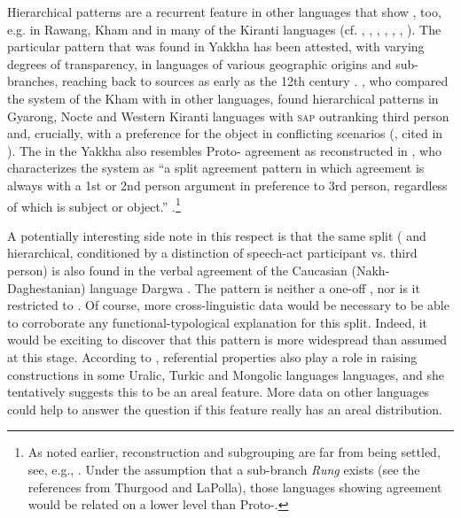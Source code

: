 Hierarchical patterns are a recurrent feature  in other  languages that show , too, e.g. in Rawang, Kham and in many of the Kiranti languages (cf. \citealt[317]{DeLancey1989Verb}, \citealt[311]{LaPolla1992Dating}, \citealt[30]{LaPolla2003_Overview}, \citealt{LaPolla2007Hierarchical}, \citealt[473]{Ebert1987Grammatical}, \citealt[1]{DeLancey2011_Notes}, \citealt[398]{Watters2002A-grammar}). The particular pattern that was found in Yakkha has been attested, with varying degrees of transparency, in  languages of various geographic origins and sub-branches, reaching back to  sources as early as the 12th century \citep{Kepping1975_Subject, Kepping1994The-conjugation}. \citet{Watters2002A-grammar}, who compared the  system of the Kham  with  in other  languages, found hierarchical patterns in Gyarong, Nocte and Western Kiranti languages with \textsc{sap} outranking third person and, crucially, with a preference for the object in conflicting scenarios (\citet{Nagano1984A-historical}, cited in \citealt[388]{Watters2002A-grammar}). The  in the Yakkha  also resembles Proto- agreement as reconstructed in \citet{DeLancey1989Verb}, who characterizes the system as  “a split  agreement pattern in which agreement is always with a 1st or 2nd person argument in preference to 3rd person, regardless of which is subject or object.” \citep[317]{DeLancey1989Verb}.\footnote{As noted earlier,  reconstruction and subgrouping are far from being settled, see, e.g., \citet{Thurgood1984The-Rung, DeLancey1989Verb, DeLancey2010_Towards, DeLancey2011_Notes, LaPolla1992Dating, LaPolla2012_Comments, Jacques2012_Agreement}. Under the assumption that  a sub-branch \emph{Rung} exists (see the references from Thurgood and LaPolla), those  languages showing agreement would be related on a lower level than Proto-.}


A potentially interesting side note in this respect is that the same  split ( and hierarchical, conditioned by a distinction of speech-act participant vs. third person) is also found in the verbal agreement of the Caucasian (Nakh-Daghestanian) language Dargwa \citep[208]{Zuniga2007_From}. The pattern is neither a one-off , nor is it restricted to . Of course, more cross-linguistic data would be necessary to be able to corroborate any functional-typological explanation for this  split. Indeed, it would be exciting to discover that this pattern is more widespread than  assumed at this stage. According to \citet{Serdobolskaya2009_Raising}, referential properties also play a role  in raising constructions in some Uralic, Turkic and Mongolic languages languages, and she tentatively suggests this to be an areal feature. More data on other languages could help to answer the question if this feature really has an areal distribution.  


